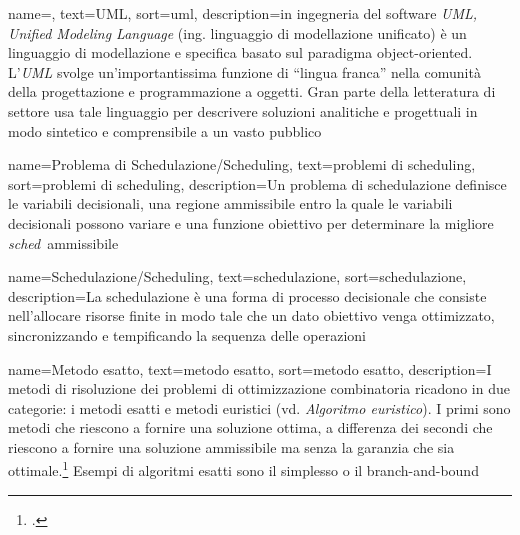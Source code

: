 
\renewcommand{\acronymname}{Acronimi e abbreviazioni}




\renewcommand{\glossaryname}{Glossario}

{
    name=,
    text=UML,
    sort=uml,
    description={in ingegneria del software \emph{UML, Unified Modeling Language} (ing. linguaggio di modellazione unificato) è un linguaggio di modellazione e specifica basato sul paradigma object-oriented. L'\emph{UML} svolge un'importantissima funzione di ``lingua franca'' nella comunità della progettazione e programmazione a oggetti. Gran parte della letteratura di settore usa tale linguaggio per descrivere soluzioni analitiche e progettuali in modo sintetico e comprensibile a un vasto pubblico}
}

{
    name=Problema di Schedulazione/Scheduling,
    text=problemi di scheduling,
    sort=problemi di scheduling,
    description={Un problema di schedulazione definisce le variabili decisionali, una regione ammissibile entro la quale le variabili decisionali possono variare e una funzione obiettivo per determinare la migliore \emph{\gls{sched}}\glsfirstoccur\ ammissibile}
}

{
    name=Schedulazione/Scheduling,
    text=schedulazione,
    sort=schedulazione,
    description={La schedulazione è una forma di processo decisionale che consiste nell'allocare risorse finite in modo tale che un dato obiettivo venga ottimizzato, sincronizzando e tempificando la sequenza delle operazioni}
}

{
    name=Metodo esatto,
    text=metodo esatto,
    sort=metodo esatto,
    description={I metodi di risoluzione dei problemi di ottimizzazione combinatoria ricadono in due categorie: i metodi esatti e metodi euristici (vd. \textit{Algoritmo euristico}). I primi sono metodi che riescono a fornire una soluzione ottima, a differenza dei secondi che riescono a fornire una soluzione ammissibile ma senza la garanzia che sia ottimale.\footcite{degio:dispensa}
    Esempi di algoritmi esatti sono il simplesso o il branch-and-bound}
}

